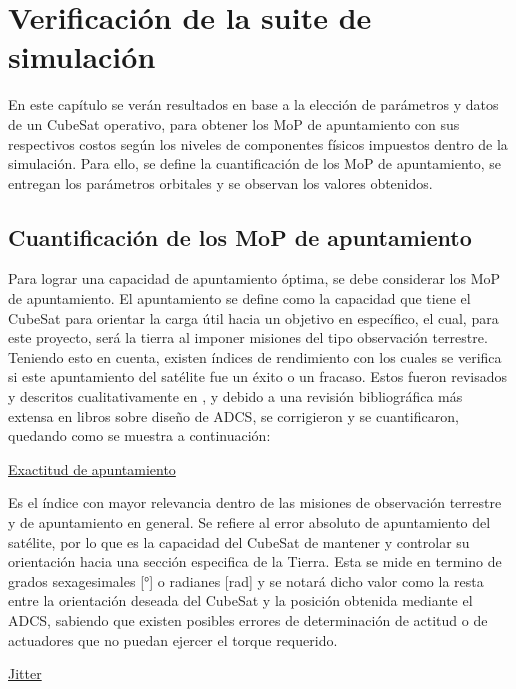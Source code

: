 \section{Verificación de la suite de simulación}

En este capítulo se verán resultados en base a la elección de parámetros y datos de un CubeSat operativo, para obtener los MoP de apuntamiento con sus respectivos costos según los niveles de componentes físicos impuestos dentro de la simulación. Para ello, se define la cuantificación de los MoP de apuntamiento, se entregan los parámetros orbitales y se observan los valores obtenidos.

\subsection{Cuantificación de los MoP de apuntamiento}

Para lograr una capacidad de apuntamiento óptima, se debe considerar los MoP de apuntamiento. El apuntamiento se define como la capacidad que tiene el CubeSat para orientar la carga útil hacia un objetivo en específico, el cual, para este proyecto, será la tierra al imponer misiones del tipo observación terrestre. Teniendo esto en cuenta, existen índices de rendimiento con los cuales se verifica si este apuntamiento del satélite fue un éxito o un fracaso. Estos fueron revisados y descritos cualitativamente en \cite{ref6}, y debido a una revisión bibliográfica más extensa en libros sobre diseño de ADCS, se corrigieron y se cuantificaron, quedando como se muestra a continuación:

\underline{Exactitud de apuntamiento \cite{ref5,ref7}}

Es el índice con mayor relevancia dentro de las misiones de observación terrestre y de apuntamiento en general. Se refiere al error absoluto de apuntamiento del satélite, por lo que es la capacidad del CubeSat de mantener y controlar su orientación hacia una sección especifica de la Tierra. Esta se mide en termino de grados sexagesimales [°] o radianes [rad] y se notará dicho valor como la resta entre la orientación deseada del CubeSat y la posición obtenida mediante el ADCS, sabiendo que existen posibles errores de determinación de actitud o de actuadores que no puedan ejercer el torque requerido.

\underline{Jitter \cite{ref5,ref9,ref10}}

